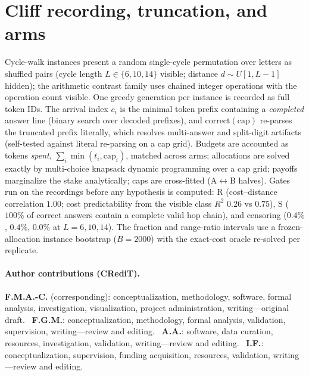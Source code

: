 \documentclass{article}
\newif\ifanon
\newcommand{\NbLRdosCliff}{$0.26$} \newcommand{\NbLRdosSuave}{$0.75$}
\begin{document}
\section{Cliff recording, truncation, and arms}\label{app:cliff}
Cycle-walk instances present a random single-cycle permutation over
letters as shuffled pairs (cycle length $L\in\{6,10,14\}$ visible;
distance $d\sim U[1,L{-}1]$ hidden); the arithmetic contrast family uses
chained integer operations with the operation count visible. One greedy
generation per instance is recorded as full token IDs. The arrival index
$c_i$ is the minimal token prefix containing a \emph{completed} answer
line (binary search over decoded prefixes), and
$\mathrm{correct}(\mathrm{cap})$ re-parses the truncated prefix
literally, which resolves multi-answer and split-digit artifacts
(self-tested against literal re-parsing on a cap grid). Budgets are
accounted as tokens \emph{spent}, $\sum_i \min(t_i,\mathrm{cap}_i)$,
matched across arms; allocations are solved exactly by multi-choice
knapsack dynamic programming over a cap grid; payoffs marginalize the
stake analytically; caps are cross-fitted (A$\leftrightarrow$B halves).
Gates run on the recordings before any hypothesis is computed: R
(cost--distance correlation $1.00$; cost predictability from the visible
class $R^2$ \NbLRdosCliff{} vs \NbLRdosSuave), S ($100\%$ of correct
answers contain a complete valid hop chain), and censoring ($0.4\%$, $0.4\%$,
$0.0\%$ at $L{=}6,10,14$). The
fraction and range-ratio intervals use a frozen-allocation instance
bootstrap ($B{=}2000$) with the exact-cost oracle re-solved per
replicate.


\paragraph{Author contributions (CRediT).} \ifanon Withheld for double-blind review. \else
\textbf{F.M.A.-C.} (corresponding): conceptualization, methodology, software,
formal analysis, investigation, visualization, project administration,
writing---original draft. \ 
\textbf{F.G.M.}: conceptualization, methodology, formal analysis, validation,
supervision, writing---review and editing. \ 
\textbf{A.A.}: software, data curation, resources, investigation, validation,
writing---review and editing. \ 
\textbf{I.F.}: conceptualization, supervision, funding acquisition, resources,
validation, writing---review and editing. \fi
\end{document}
